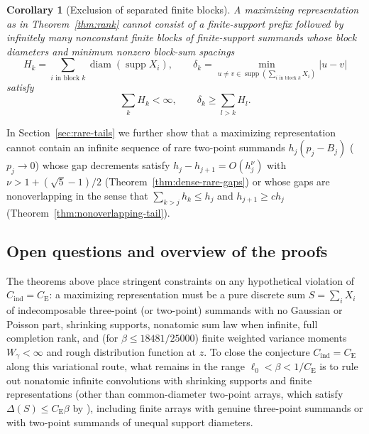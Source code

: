 \documentclass[11pt]{article}
\numberwithin{equation}{section}
\newtheorem{corollary}[theorem]{Corollary}
\theoremstyle{definition}
\DeclareMathOperator{\diam}{diam}
\DeclareMathOperator{\supp}{supp}
\newcommand{\ce}{C_{\mathrm E}}
\newcommand{\ci}{C_{\mathrm{ind}}}
\begin{document}
\begin{corollary}[Exclusion of separated finite blocks]\label{cor:separated}
A maximizing representation as in Theorem~\ref{thm:rank} cannot consist of a
finite-support prefix followed by infinitely many nonconstant finite blocks
of finite-support summands whose block diameters and minimum nonzero block-sum
spacings
\[
 H_k=\sum_{i\text{ in block }k}\diam(\supp X_i),\qquad
 \delta_k=\min_{u\ne v\in\supp(\sum_{i\text{ in block }k}X_i)}|u-v|
\]
satisfy
\begin{equation}\label{eq:separation}
              \sum_k H_k<\infty,
              \qquad \delta_k\ge\sum_{l>k}H_l.
\end{equation}
\end{corollary}

In Section~\ref{sec:rare-tails} we further show that a maximizing
representation cannot contain an infinite sequence of rare two-point summands
$h_j(p_j-B_j)$ ($p_j\to0$) whose gap decrements satisfy $h_j-h_{j+1}=O(h_j^\nu)$
with $\nu>1+(\sqrt5-1)/2$ (Theorem~\ref{thm:dense-rare-gaps}) or whose gaps
are nonoverlapping in the sense that $\sum_{k>j}h_k\le h_j$ and
$h_{j+1}\ge ch_j$ (Theorem~\ref{thm:nonoverlapping-tail}).

\subsection{Open questions and overview of the proofs}

The theorems above place stringent constraints on any hypothetical violation
of $\ci=\ce$: a maximizing representation must be a pure discrete sum
$S=\sum_i X_i$ of indecomposable three-point (or two-point) summands with no
Gaussian or Poisson part, shrinking supports, nonatomic sum law when infinite,
full completion rank, and (for $\beta\le18481/25000$) finite weighted variance
moments $W_\gamma<\infty$ and rough distribution function at $z$. To close
the conjecture $\ci=\ce$ along this variational route, what remains in the
range $\ell_0<\beta<1/\ce$ is to rule out nonatomic infinite convolutions with
shrinking supports and finite representations (other than common-diameter
two-point arrays, which satisfy $\Delta(S)\le\ce\beta$ by \citet{BellFinite2026}),
including finite arrays with genuine three-point summands or with two-point
summands of unequal support diameters.
\end{document}
